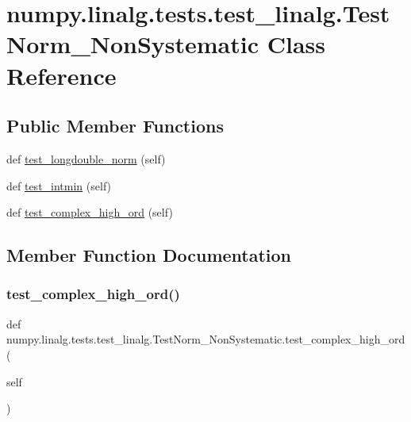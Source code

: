 \hypertarget{classnumpy_1_1linalg_1_1tests_1_1test__linalg_1_1TestNorm__NonSystematic}{}\section{numpy.\+linalg.\+tests.\+test\+\_\+linalg.\+Test\+Norm\+\_\+\+Non\+Systematic Class Reference}
\label{classnumpy_1_1linalg_1_1tests_1_1test__linalg_1_1TestNorm__NonSystematic}
\subsection*{Public Member Functions}
\begin{DoxyCompactItemize}
\item 
def \hyperlink{classnumpy_1_1linalg_1_1tests_1_1test__linalg_1_1TestNorm__NonSystematic_a925b03ddbda27e9c8cd2c9692238a003}{test\+\_\+longdouble\+\_\+norm} (self)
\item 
def \hyperlink{classnumpy_1_1linalg_1_1tests_1_1test__linalg_1_1TestNorm__NonSystematic_ad22e8e2b55b9cf638f1a166332261871}{test\+\_\+intmin} (self)
\item 
def \hyperlink{classnumpy_1_1linalg_1_1tests_1_1test__linalg_1_1TestNorm__NonSystematic_a808b59dd9fa98e3637f6345bc0752bc1}{test\+\_\+complex\+\_\+high\+\_\+ord} (self)
\end{DoxyCompactItemize}


\subsection{Member Function Documentation}
\mbox{\label{classnumpy_1_1linalg_1_1tests_1_1test__linalg_1_1TestNorm__NonSystematic_a808b59dd9fa98e3637f6345bc0752bc1}} 
\subsubsection{\texorpdfstring{test\+\_\+complex\+\_\+high\+\_\+ord()}{test\_complex\_high\_ord()}}
{\footnotesize\ttfamily def numpy.\+linalg.\+tests.\+test\+\_\+linalg.\+Test\+Norm\+\_\+\+Non\+Systematic.\+test\+\_\+complex\+\_\+high\+\_\+ord (\begin{DoxyParamCaption}\item[{}]{self }\end{DoxyParamCaption})}

